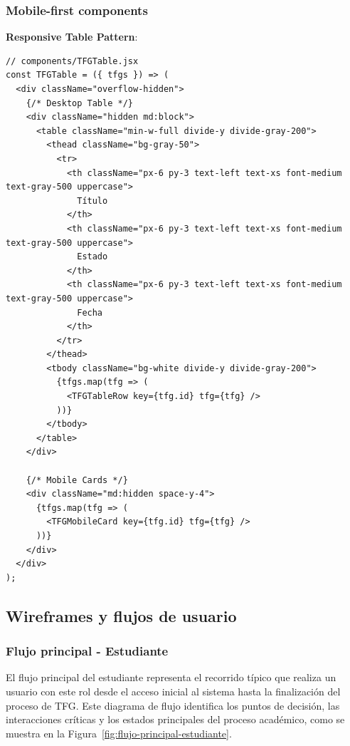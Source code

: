 \documentclass[12pt,a4paper,oneside]{report}
\begin{document}
\subsubsection{Mobile-first components}\label{mobile-first-components}

\textbf{Responsive Table Pattern}:

\begin{lstlisting}
// components/TFGTable.jsx
const TFGTable = ({ tfgs }) => (
  <div className="overflow-hidden">
    {/* Desktop Table */}
    <div className="hidden md:block">
      <table className="min-w-full divide-y divide-gray-200">
        <thead className="bg-gray-50">
          <tr>
            <th className="px-6 py-3 text-left text-xs font-medium text-gray-500 uppercase">
              Título
            </th>
            <th className="px-6 py-3 text-left text-xs font-medium text-gray-500 uppercase">
              Estado
            </th>
            <th className="px-6 py-3 text-left text-xs font-medium text-gray-500 uppercase">
              Fecha
            </th>
          </tr>
        </thead>
        <tbody className="bg-white divide-y divide-gray-200">
          {tfgs.map(tfg => (
            <TFGTableRow key={tfg.id} tfg={tfg} />
          ))}
        </tbody>
      </table>
    </div>
    
    {/* Mobile Cards */}
    <div className="md:hidden space-y-4">
      {tfgs.map(tfg => (
        <TFGMobileCard key={tfg.id} tfg={tfg} />
      ))}
    </div>
  </div>
);
\end{lstlisting}

\subsection{Wireframes y flujos de
usuario}\label{wireframes-y-flujos-de-usuario}

\subsubsection{Flujo principal -
Estudiante}\label{flujo-principal---estudiante}

El flujo principal del estudiante representa el recorrido típico que realiza un usuario con este rol desde el acceso inicial al sistema hasta la finalización del proceso de TFG. Este diagrama de flujo identifica los puntos de decisión, las interacciones críticas y los estados principales del proceso académico, como se muestra en la Figura~\ref{fig:flujo-principal-estudiante}.
\end{document}
